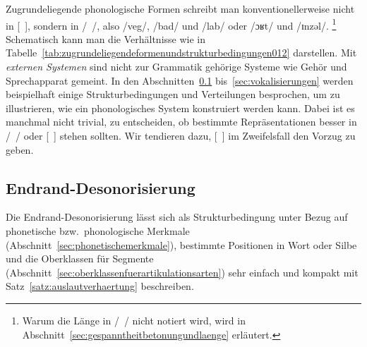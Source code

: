 \begin{table}[!htbp]
  \caption{Lexikon, Phonologie und Phonetik}
  \label{tab:zugrundeliegendeformenundstrukturbedingungen012}
\end{table}

Zugrundeliegende phonologische Formen schreibt man konventionellerweise nicht in [~], sondern in /~/, also \zB /veg/, /bad/ und /lab/ oder /ɔʁt/ und \mbox{/ɪnzəl/}.%
\footnote{Warum die Länge in /~/ nicht notiert wird, wird in Abschnitt~\ref{sec:gespanntheitbetonungundlaenge} erläutert.}
Schematisch kann man die Verhältnisse wie in Tabelle~\ref{tab:zugrundeliegendeformenundstrukturbedingungen012} darstellen.
Mit \textit{externen Systemen} sind nicht zur Grammatik gehörige Systeme wie Gehör und Sprechapparat gemeint.
In den Abschnitten~\ref{sec:endranddesonorisierung} bis~\ref{sec:vokalisierungen} werden beispielhaft einige Strukturbedingungen und Verteilungen besprochen, um zu illustrieren, wie ein phonologisches System konstruiert werden kann.
Dabei ist es manchmal nicht trivial, zu entscheiden, ob bestimmte Repräsentationen besser in /~/ oder [~] stehen sollten.
Wir tendieren dazu, [~] im Zweifelsfall den Vorzug zu geben.

\subsection{Endrand-Desonorisierung}
\label{sec:endranddesonorisierung}


Die Endrand-Desonorisierung lässt sich als Strukturbedingung unter Bezug auf phonetische bzw.\ phonologische Merkmale (Abschnitt~\ref{sec:phonetischemerkmale}), bestimmte Positionen in Wort oder Silbe und die Oberklassen für Segmente (Abschnitt~\ref{sec:oberklassenfuerartikulationsarten}) sehr einfach und kompakt mit Satz~\ref{satz:auslautverhaertung} beschreiben.

